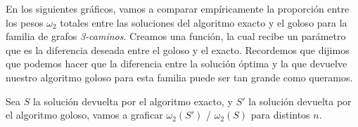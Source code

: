 
En los siguientes gráficos, vamos a comparar empíricamente la proporción entre los pesos $\omega_2$ totales entre las soluciones del algoritmo exacto y el goloso para la familia de grafos \emph{3-caminos}. Creamos una función, la cual recibe un parámetro que es la diferencia deseada entre el goloso y el exacto. Recordemos que dijimos que podemos hacer que la diferencia entre la solución óptima y la que devuelve nuestro algoritmo goloso para esta familia puede ser tan grande como queramos.

Sea $S$ la solución devuelta por el algoritmo exacto, y $S'$ la solución devuelta por el algoritmo goloso, vamos a graficar $\omega_2(S')$ / $\omega_2(S)$ para distintos $n$.


